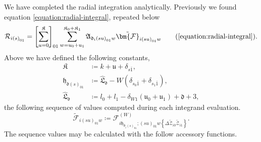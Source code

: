We have completed the radial integration analytically. Previously we found
equation \eqref{equation:radial-integral}, repeated below
\begin{equation}
\mathcal{R}_{i\left(s\right)_{01}}
    =
        \left[ \sum_{u=0}^{\mathfrak{K}} \right]_{01}
        \sum_{w=u_{0}+u_{1}}^{\mathfrak{K}_{0}+\mathfrak{K}_{1}}
        \mathfrak{A}_{\mathfrak{d}_{i}\left(su\right)_{01}w}
        \tilde{\bm{\mathcal{F}}}_{i\left(su\right)_{01}w}
\tag{\ref{equation:radial-integral}}
.
\end{equation}
Above we have defined the following constants,
\begin{align}
\mathfrak{K}
    &\coloneqq
        k + \mathfrak{u} + \delta_{s\bar{1}}
,\\
\mathfrak{h}_{\mathfrak{d}\left(s\right)_{01}}
    &\coloneqq
        \hat{\mathfrak{L}}_{\mathfrak{d}}
        - W\left(\delta_{s_{0}\bar{1}} + \delta_{s_{1}\bar{1}}\right)
,\\
\hat{\mathfrak{L}}_{\mathfrak{d}}
    &\coloneqq
        l_{0} + l_{1}
        -\delta_{W1}\left(\mathfrak{u}_{0}+\mathfrak{u}_{1}\right)
        +\mathfrak{d}+3
,
\end{align}
the following sequence of values computed during each integrand evaluation.
\begin{equation}
\tilde{\bm{\mathcal{F}}}_{i\left(su\right)_{01}w}
    \coloneqq
        \mathcal{F}
        _{
            i\mathfrak{h}_{\mathfrak{d}_{i}\left(s\right)_{01}};
            \left(su\right)_{01}w
            \left\{
                \Delta
                \tilde{\mathcal{Z}}_{i0}
                \tilde{\mathcal{Z}}_{i1}
            \right\}
        }
        ^{\left(W\right)}
.
\end{equation}
The sequence values may be calculated with the follow accessory functions.
